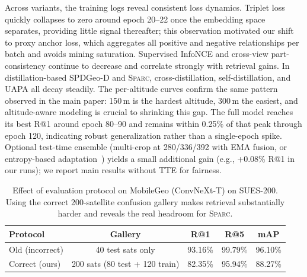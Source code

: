 \documentclass[sigconf, anonymous, review]{acmart}
\newcommand{\ours}{\textsc{Sparc}}
\begin{document}
Across variants, the training logs reveal consistent loss dynamics.
Triplet loss quickly collapses to zero around epoch 20--22 once the embedding space separates, providing little signal thereafter; this observation motivated our shift to proxy anchor loss, which aggregates all positive and negative relationships per batch and avoids mining saturation.
Supervised InfoNCE and cross-view part-consistency continue to decrease and correlate strongly with retrieval gains.
In distillation-based SPDGeo-D and \ours{}, cross-distillation, self-distillation, and UAPA all decay steadily.
The per-altitude curves confirm the same pattern observed in the main paper: 150\,m is the hardest altitude, 300\,m the easiest, and altitude-aware modeling is crucial to shrinking this gap.
The full model reaches its best R@1 around epoch 80--90 and remains within 0.25\% of that peak through epoch 120, indicating robust generalization rather than a single-epoch spike.
Optional test-time ensemble (multi-crop at 280/336/392 with EMA fusion, or entropy-based adaptation~\cite{wang2021tent}) yields a small additional gain (e.g., +0.08\% R@1 in our runs); we report main results without TTE for fairness.

\begin{table}[h]
\caption{Effect of evaluation protocol on MobileGeo (ConvNeXt-T) on SUES-200. Using the correct 200-satellite confusion gallery makes retrieval substantially harder and reveals the real headroom for \ours{}.}
\label{tab:app_protocol}
\centering
\small
\begin{tabular}{@{}lcccc@{}}
\toprule
\textbf{Protocol} & \textbf{Gallery} & \textbf{R@1} & \textbf{R@5} & \textbf{mAP} \\
\midrule
Old (incorrect) & 40 test sats only & 93.16\% & 99.79\% & 96.10\% \\
Correct (ours)  & 200 sats (80 test + 120 train) & 82.35\% & 95.94\% & 88.27\% \\
\bottomrule
\end{tabular}
\end{table}
\end{document}
